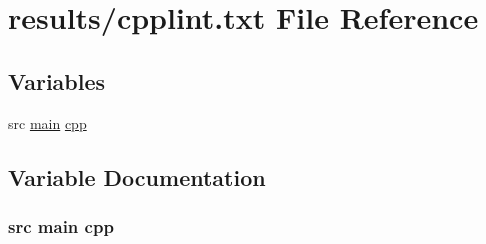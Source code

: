 \hypertarget{cpplint_8txt}{}\section{results/cpplint.txt File Reference}
\label{cpplint_8txt}
\subsection*{Variables}
\begin{DoxyCompactItemize}
\item 
src \hyperlink{test_2main_8cpp_a3c04138a5bfe5d72780bb7e82a18e627}{main} \hyperlink{cpplint_8txt_a75aa4eb49cbd493e20a62f4d44489c69}{cpp}
\end{DoxyCompactItemize}


\subsection{Variable Documentation}
\subsubsection[{\texorpdfstring{cpp}{cpp}}]{\setlength{\rightskip}{0pt plus 5cm}src {\bf main} cpp}\hypertarget{cpplint_8txt_a75aa4eb49cbd493e20a62f4d44489c69}{}\label{cpplint_8txt_a75aa4eb49cbd493e20a62f4d44489c69}

